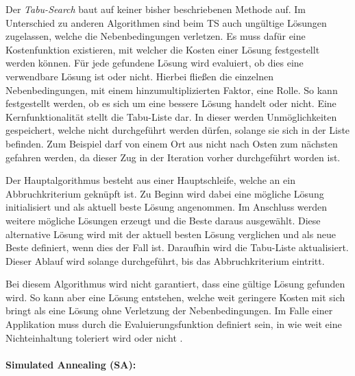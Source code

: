 Der \textit{Tabu-Search} baut auf keiner bisher beschriebenen Methode auf. 
Im Unterschied zu anderen Algorithmen sind beim TS auch ungültige Lösungen zugelassen, welche die Nebenbedingungen verletzen. 
Es muss dafür eine Kostenfunktion existieren, mit welcher die Kosten einer Lösung festgestellt werden können. 
Für jede gefundene Lösung wird evaluiert, ob dies eine verwendbare Lösung ist oder nicht. 
Hierbei fließen die einzelnen Nebenbedingungen, mit einem hinzumultiplizierten Faktor, eine Rolle. 
So kann festgestellt werden, ob es sich um eine bessere Lösung handelt oder nicht. 
Eine Kernfunktionalität stellt die Tabu-Liste dar. 
In dieser werden Unmöglichkeiten gespeichert, welche nicht durchgeführt werden dürfen, solange sie sich in der Liste befinden. 
Zum Beispiel darf von einem Ort aus nicht nach Osten zum nächsten gefahren werden, da dieser Zug in der Iteration vorher durchgeführt worden ist. 

\noindent
Der Hauptalgorithmus besteht aus einer Hauptschleife, welche an ein Abbruchkriterium geknüpft ist. 
Zu Beginn wird dabei eine mögliche Lösung initialisiert und als aktuell beste Lösung angenommen. 
Im Anschluss werden weitere mögliche Lösungen erzeugt und die Beste daraus ausgewählt. 
Diese alternative Lösung wird mit der aktuell besten Lösung verglichen und als neue Beste definiert, wenn dies der Fall ist. 
Daraufhin wird die Tabu-Liste aktualisiert. 
Dieser Ablauf wird solange durchgeführt, bis das Abbruchkriterium eintritt.

\noindent 
Bei diesem Algorithmus wird nicht garantiert, dass eine gültige Lösung gefunden wird. 
So kann aber eine Lösung entstehen, welche weit geringere Kosten mit sich bringt als eine Lösung ohne Verletzung der Nebenbedingungen. 
Im Falle einer Applikation muss durch die Evaluierungsfunktion definiert sein, in wie weit eine Nichteinhaltung toleriert wird oder nicht \cite{jp2010opttrans}. 

\paragraph{Simulated Annealing (SA):} 

